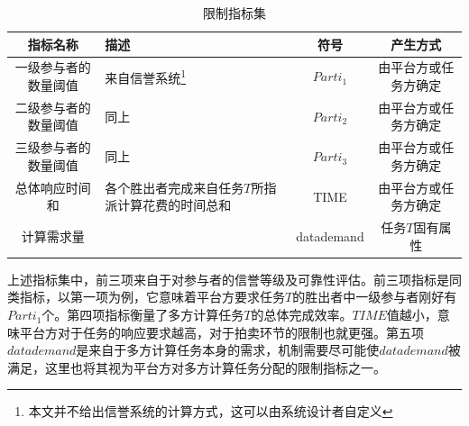 \documentclass[promaster]{thesis-uestc}
\begin{document}
\begin{table}[h]
\caption{限制指标集}
\label{zhibiao}
\begin{tabular}{cp{10em}cc}
    \toprule
    指标名称& 描述&符号&产生方式\\
    \midrule
    一级参与者的数量阈值&来自信誉系统\footnote{本文并不给出信誉系统的计算方式，这可以由系统设计者自定义}&$Parti_1$&由平台方或任务方确定\\
    二级参与者的数量阈值& 同上&$Parti_2$&由平台方或任务方确定\\
    三级参与者的数量阈值& 同上&$Parti_3$&由平台方或任务方确定\\
    总体响应时间和&各个胜出者完成来自任务$T$所指派计算花费的时间总和&TIME&由平台方或任务方确定\\
    计算需求量&&datademand&任务$T$固有属性\\
    \bottomrule
\end{tabular}
\end{table}

上述指标集中，前三项来自于对参与者的信誉等级及可靠性评估。前三项指标是同类指标，以第一项为例，它意味着平台方要求任务$T$的胜出者中一级参与者刚好有$Parti_1$个。第四项指标衡量了多方计算任务$T$的总体完成效率。$TIME$值越小，意味平台方对于任务的响应要求越高，对于拍卖环节的限制也就更强。第五项$datademand$是来自于多方计算任务本身的需求，机制需要尽可能使$datademand$被满足，这里也将其视为平台方对多方计算任务分配的限制指标之一。
\end{document}
